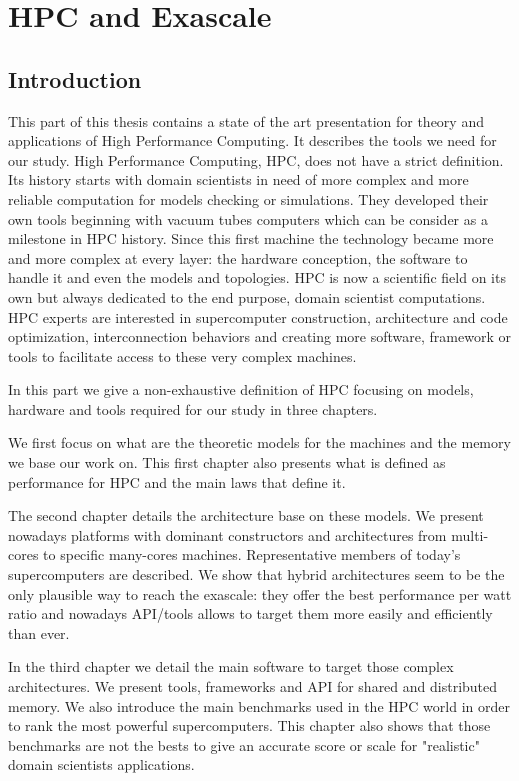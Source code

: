 \part{HPC and Exascale}
\chapter*{Introduction}

This part of this thesis contains a state of the art presentation for theory and applications of High Performance Computing.
It describes the tools we need for our study. 
High Performance Computing, HPC, does not have a strict definition. 
Its history starts with domain scientists in need of more complex and more reliable computation for models checking or simulations. 
They developed their own tools beginning  with vacuum tubes computers which can be consider as a milestone in HPC history. 
Since this first machine the technology became more and more complex at every layer: the hardware conception, the software to handle it and even the models and topologies.
HPC is now a scientific field on its own but always dedicated to the end purpose, domain scientist computations. 
HPC experts are interested in supercomputer construction, architecture and code optimization, interconnection behaviors and creating more software, framework or tools to facilitate access to these very complex machines. 

In this part we give a non-exhaustive definition of HPC focusing on models, hardware and tools required for our study in three chapters.

We first focus on what are the theoretic models for the machines and the memory we base our work on. 
This first chapter also presents what is defined as performance for HPC and the main laws that define it. 

The second chapter details the architecture base on these models. 
We present nowadays platforms with dominant constructors and architectures from multi-cores to specific many-cores machines. 
Representative members of today's supercomputers are described.  
We show that hybrid architectures seem to be the only plausible way to reach the exascale: they offer the best performance per watt ratio and nowadays API/tools allows to target them more easily and efficiently than ever.  

In the third chapter we detail the main software to target those complex architectures. 
We present tools, frameworks and API for shared and distributed memory. 
We also introduce the main benchmarks used in the HPC world in order to rank the most powerful supercomputers. 
This chapter also shows that those benchmarks are not the bests to give an accurate score or scale for "realistic" domain scientists applications.

